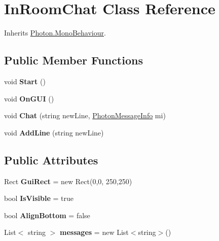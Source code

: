 \hypertarget{class_in_room_chat}{}\section{In\+Room\+Chat Class Reference}
\label{class_in_room_chat}


Inherits \hyperlink{class_photon_1_1_mono_behaviour}{Photon.\+Mono\+Behaviour}.

\subsection*{Public Member Functions}
\begin{DoxyCompactItemize}
\item 
void {\bfseries Start} ()\hypertarget{class_in_room_chat_a6b783c7f6c334ee0b0c1384f83928fab}{}\label{class_in_room_chat_a6b783c7f6c334ee0b0c1384f83928fab}

\item 
void {\bfseries On\+G\+UI} ()\hypertarget{class_in_room_chat_af9fe56fdb21db3868eda31175fe5512c}{}\label{class_in_room_chat_af9fe56fdb21db3868eda31175fe5512c}

\item 
void {\bfseries Chat} (string new\+Line, \hyperlink{class_photon_message_info}{Photon\+Message\+Info} mi)\hypertarget{class_in_room_chat_a4d96349205f511958033febb9f30461f}{}\label{class_in_room_chat_a4d96349205f511958033febb9f30461f}

\item 
void {\bfseries Add\+Line} (string new\+Line)\hypertarget{class_in_room_chat_ad942cd6f67bcf966adcf976fbd3055bd}{}\label{class_in_room_chat_ad942cd6f67bcf966adcf976fbd3055bd}

\end{DoxyCompactItemize}
\subsection*{Public Attributes}
\begin{DoxyCompactItemize}
\item 
Rect {\bfseries Gui\+Rect} = new Rect(0,0, 250,250)\hypertarget{class_in_room_chat_acc85d6ed055432d0cff5a93f8de88a39}{}\label{class_in_room_chat_acc85d6ed055432d0cff5a93f8de88a39}

\item 
bool {\bfseries Is\+Visible} = true\hypertarget{class_in_room_chat_adbfef915a36e98692020697a6cacfca6}{}\label{class_in_room_chat_adbfef915a36e98692020697a6cacfca6}

\item 
bool {\bfseries Align\+Bottom} = false\hypertarget{class_in_room_chat_a83f0c6044fed77a2950457f30ac2607c}{}\label{class_in_room_chat_a83f0c6044fed77a2950457f30ac2607c}

\item 
List$<$ string $>$ {\bfseries messages} = new List$<$string$>$()\hypertarget{class_in_room_chat_aaf95335cf66ac85905d13191dd5da780}{}\label{class_in_room_chat_aaf95335cf66ac85905d13191dd5da780}

\end{DoxyCompactItemize}
